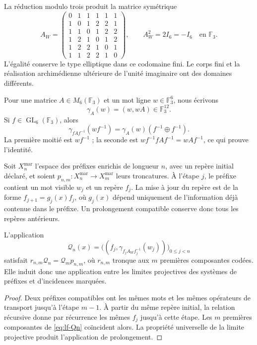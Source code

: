 La réduction modulo trois produit la matrice symétrique
\begin{equation}
 A_W=
 \begin{pmatrix}
 0&1&1&1&1&1\\
 1&0&1&2&2&1\\
 1&1&0&1&2&2\\
 1&2&1&0&1&2\\
 1&2&2&1&0&1\\
 1&1&2&2&1&0
 \end{pmatrix},
 \qquad A_W^2=2I_6=-I_6
 \quad\text{en }\mathbb F_3.
 \label{eq:lf-aw}
\end{equation}
L’égalité conserve le type elliptique dans ce codomaine fini.
Le corps fini et la réalisation archimédienne ultérieure de
l’unité imaginaire ont des domaines différents.

Pour une matrice \(A\in M_6(\mathbb F_3)\) et un mot ligne
\(w\in\mathbb F_3^6\), nous écrivons
\[
 \gamma_A(w)=(w,wA)\in\mathbb F_3^{12}.
\]
Si \(f\in\operatorname{GL}_6(\mathbb F_3)\), alors
\begin{equation}
 \gamma_{fAf^{-1}}(wf^{-1})
   =\gamma_A(w)(f^{-1}\oplus f^{-1}).
 \label{eq:lf-frame-covariance}
\end{equation}
La première moitié est \(wf^{-1}\) ; la seconde est \(wf^{-1}fAf^{-1}=wAf^{-1}\), ce qui prouve l'identité.

Soit \(X_n^{\mathrm{mar}}\) l’espace des préfixes enrichis de
longueur \(n\), avec un repère initial déclaré, et soient
\(p_{n,m}:X_n^{\mathrm{mar}}\to X_m^{\mathrm{mar}}\) leurs
troncatures. À l’étape \(j\), le préfixe contient un mot
visible \(w_j\) et un repère \(f_j\). La mise à jour du repère
est de la forme \(f_{j+1}=g_j(x)f_j\), où \(g_j(x)\) dépend
uniquement de l’information déjà contenue dans le préfixe. Un
prolongement compatible conserve donc tous les repères
antérieurs.

\begin{proposition}
\label{prop:lf-incidence-naturality}
L'application
\begin{equation}
 \mathcal Q_n(x)=
 \bigl((f_j,\gamma_{f_jA_Wf_j^{-1}}(w_j))\bigr)_{0\leq j<n}
 \label{eq:lf-Qn}
\end{equation}
satisfait \(r_{n,m}\mathcal Q_n=\mathcal Q_mp_{n,m}\), où \(r_{n,m}\) tronque aux \(m\) premières composantes codées. Elle induit donc une application entre les limites projectives des systèmes de préfixes et d'incidences marquées.
\end{proposition}
\begin{proof}
Deux préfixes compatibles ont les mêmes mots et les mêmes opérateurs de transport jusqu'à l'étape \(m-1\). À partir du même repère initial, la relation récursive donne par récurrence les mêmes \(f_j\) jusqu'à cette étape. Les \(m\) premières composantes de \eqref{eq:lf-Qn} coïncident alors. La propriété universelle de la limite projective produit l'application de prolongement.
\end{proof}

